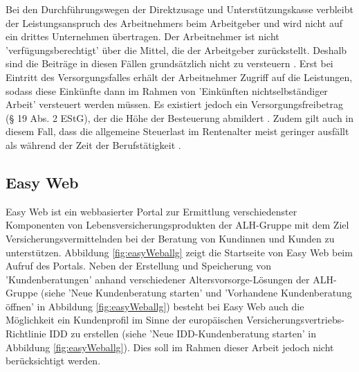 Bei den Durchführungswegen der Direktzusage und Unterstützungskasse verbleibt der Leistungsanspruch des Arbeitnehmers beim Arbeitgeber und wird nicht auf ein drittes Unternehmen übertragen. Der Arbeitnehmer ist nicht 'verfügungsberechtigt' \cite[S. 137]{buttler2017einfuehrung} über die Mittel, die der Arbeitgeber zurückstellt. Deshalb sind die Beiträge in diesen Fällen grundsätzlich nicht zu versteuern \cite[S. 138]{buttler2017einfuehrung}. Erst bei Eintritt des Versorgungsfalles erhält der Arbeitnehmer Zugriff auf die Leistungen, sodass diese Einkünfte dann im Rahmen von 'Einkünften nichtselbständiger Arbeit' \cite[S. 138]{buttler2017einfuehrung} versteuert werden müssen. Es existiert jedoch ein Versorgungsfreibetrag (§ 19 Abs. 2 EStG), der die Höhe der Besteuerung abmildert \cite[S. 138]{buttler2017einfuehrung}. Zudem gilt auch in diesem Fall, dass die allgemeine Steuerlast im Rentenalter meist geringer ausfällt als während der Zeit der Berufstätigkeit \cite{verbraucherzentrale}.

\subsection{Easy Web}

Easy Web \cite{easy_web} ist ein webbasierter Portal zur Ermittlung verschiedenster Komponenten von Lebensversicherungsprodukten der ALH-Gruppe mit dem Ziel Versicherungsvermittelnden bei der Beratung von Kundinnen und Kunden zu unterstützen. Abbildung \ref{fig:easyWeballg} zeigt die Startseite von Easy Web beim Aufruf des Portals. Neben der Erstellung und Speicherung von 'Kundenberatungen' anhand verschiedener Altersvorsorge-Lösungen der ALH-Gruppe (siehe 'Neue Kundenberatung starten' und 'Vorhandene Kundenberatung öffnen' in Abbildung \ref{fig:easyWeballg}) besteht bei Easy Web auch die Möglichkeit ein Kundenprofil im Sinne der europäischen Versicherungsvertriebs-Richtlinie IDD zu erstellen (siehe 'Neue IDD-Kundenberatung starten' in Abbildung \ref{fig:easyWeballg}). Dies soll im Rahmen dieser Arbeit jedoch nicht berücksichtigt werden. 

